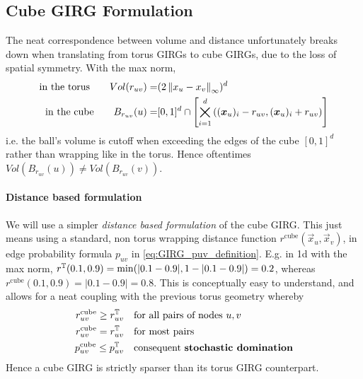 \subsection{Cube GIRG Formulation}
The neat correspondence between volume and distance unfortunately breaks down when translating from torus GIRGs to cube GIRGs, due to the loss of spatial symmetry.
With the max norm,
\begin{align}
\text{in the torus} \quad \quad Vol(r_{uv}) =& (2 \left\lVert x_u - x_v\right\rVert_\infty)^d
\\
\text{in the cube} \quad \quad B_{r_{uv}}(u) =& [0, 1]^d \cap 
    \left [ 
        \bigtimes_{i=1}^d 
        \left ( (\bm{x}_{u})_{i} - r_{uv}, (\bm{x}_{u})_{i} + r_{uv} \right ) 
    \right ]
\end{align}
i.e. the ball's volume is cutoff when exceeding the edges of the cube $[0,1]^d$ rather than wrapping like in the torus. Hence oftentimes $Vol(B_{r_{uv}}(u)) \neq Vol(B_{r_{uv}}(v))$. 

\paragraph{Distance based formulation} We will use a simpler \textit{distance based formulation} of the cube GIRG.
This just means using a standard, non torus wrapping distance function $r^\text{cube}(\vec{x}_u, \vec{x}_v)$, in edge probability formula $p_{uv}$ in \cref{eq:GIRG_puv_definition}.
 E.g. in 1d with the max norm, $r^{\mathbb{T}}(0.1, 0.9) = \min(|0.1 - 0.9|, 1 - |0.1 - 0.9|) = 0.2$, whereas $r^\text{cube}(0.1, 0.9) = |0.1 - 0.9| = 0.8$.
This is conceptually easy to understand, and allows for a neat coupling with the previous torus geometry whereby
\begin{align}
r_{uv}^\text{cube} \geq r_{uv}^{\mathbb{T}}
\quad & \text{for all pairs of nodes $u, v$}
\\
r_{uv}^\text{cube} = r_{uv}^{\mathbb{T}}
\quad & \text{for most pairs}
\\
p_{uv}^\text{cube} \leq p_{uv}^{\mathbb{T}}
\quad & \text{consequent \textbf{stochastic domination}}
\end{align}
Hence a cube GIRG is strictly sparser than its torus GIRG counterpart.

